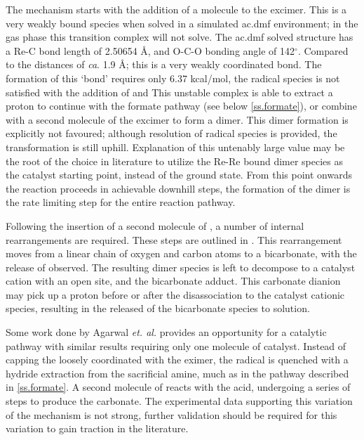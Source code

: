 The mechanism starts with the addition of a  molecule to the excimer. This is a very weakly bound species when solved in a simulated \gls{ac.dmf} environment; in the gas phase this transition complex will not solve. The \gls{ac.dmf} solved structure has a Re-C bond length of 2.50654 \r{A}, and O-C-O bonding angle of 142$^\circ$. Compared to the  distances of \textit{ca}. 1.9 \r{A}; this is a very weakly coordinated bond. The formation of this `bond' requires only 6.37 kcal/mol, the radical species is not satisfied with the addition of  and  This unstable complex is able to extract a proton to continue with the formate pathway (see below \autoref{ss.formate}), or combine with a second molecule of the excimer to form a dimer. This dimer formation is explicitly not favoured; although resolution of radical species is provided, the transformation is still  uphill. Explanation of this untenably large value may be the root of the choice in literature to utilize the Re-Re bound dimer species as the catalyst starting point, instead of the ground state. From this point onwards the reaction proceeds in achievable downhill steps, the formation of the dimer is the rate limiting step for the entire reaction pathway. 

Following the insertion of a second molecule of , a number of internal rearrangements are required. These steps are outlined in . This rearrangement moves from a linear chain of oxygen and carbon atoms to a bicarbonate, with the release of  observed. The resulting dimer species is left to decompose to a catalyst cation with an open site, and the bicarbonate adduct. This carbonate dianion may pick up a proton before or after the disassociation to the catalyst cationic species, resulting in the released of the bicarbonate species to solution. 

Some work done by Agarwal \textit{et. al.} provides an opportunity for a catalytic pathway with similar results requiring only one molecule of catalyst. Instead of capping the loosely coordinated  with the eximer, the radical is quenched with a hydride extraction from the sacrificial amine, much as in the pathway described in \autoref{ss.formate}. A second molecule of  reacts with the acid, undergoing a series of steps to produce the carbonate. The experimental data supporting this variation of the mechanism is not strong, further validation should be required for this variation to gain traction in the literature. 

